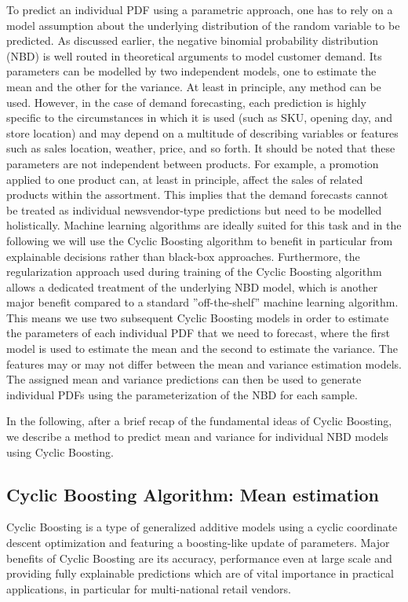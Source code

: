\documentclass[BCOR=1mm, DIV=calc,10pt,
twoside=true,
twocolumn,
headings=normal]{scrartcl}
\begin{document}
To predict an individual PDF using a parametric approach, one has to rely on a model assumption about the underlying distribution of the random variable to be predicted. As discussed earlier, the negative binomial probability distribution (NBD) is well routed in theoretical arguments to model customer demand. Its parameters can be modelled by two independent models, one to estimate the mean and the other for the variance. At least in principle, any method can be used. However, in the case of demand forecasting, each prediction is highly specific to the circumstances in which it is used (such as SKU, opening day, and store location) and may depend on a multitude of describing variables or features such as sales location, weather, price, and so forth. It should be noted that these parameters are not independent between products. For example, a promotion applied to one product can, at least in principle, affect the sales of related products within the assortment. This implies that the demand forecasts cannot be treated as individual newsvendor-type predictions but need to be modelled holistically. Machine learning algorithms are ideally suited for this task and in the following we will use the Cyclic Boosting algorithm to benefit in particular from explainable decisions rather than black-box approaches. Furthermore, the regularization approach used during training of the Cyclic Boosting algorithm allows a dedicated treatment of the underlying NBD model, which is another major benefit compared to a standard ''off-the-shelf'' machine learning algorithm. This means we use two subsequent Cyclic Boosting models in order to estimate the parameters of each individual PDF that we need to forecast, where the first model is used to estimate the mean and the second to estimate the variance. The features may or may not differ between the mean and variance estimation models. The assigned mean and variance predictions can then be used to generate individual PDFs using the parameterization of the NBD for each sample.

In the following, after a brief recap of the fundamental ideas of Cyclic Boosting, we describe a method to predict mean and variance for individual NBD models using Cyclic Boosting.

\subsection{Cyclic Boosting Algorithm: Mean estimation}
\label{sec:CB}

Cyclic Boosting \cite{Wick2019} is a type of generalized additive models using a cyclic coordinate descent optimization and featuring a boosting-like update of parameters. Major benefits of Cyclic Boosting are its accuracy, performance even at large scale and providing fully explainable predictions which are of vital importance in practical applications, in particular for multi-national retail vendors.
\end{document}
